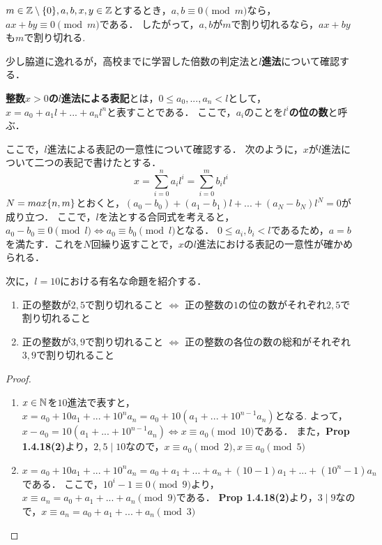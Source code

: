     \begin{cor}
      $ m \in \mathbb{Z} \setminus \lbrace0\rbrace, a,b,x,y \in \mathbb{Z}$とするとき，$a,b \equiv 0 \pmod m$なら，
      $ax + by \equiv 0 \pmod m$である．
      したがって，$a,b$が$m$で割り切れるなら，$ax+by$も$m$で割り切れる.
    \end{cor}

    少し脇道に逸れるが，高校までに学習した倍数の判定法と\textbf{$l$進法}について確認する．

    \begin{dfn}
      \textbf{整数$x>0$の$l$進法による表記}とは，$0 \leq a_0, ... , a_n < l$として，
      $x = a_0 + a_1 l + ... + a_n l^n$と表すことである．
      ここで，$a_i$のことを\textbf{$l^i$の位の数}と呼ぶ．
    \end{dfn}

    ここで，$l$進法による表記の一意性について確認する．
    次のように，$x$が$l$進法について二つの表記で書けたとする．
    \begin{displaymath}
      x = \sum_{i=0}^{n}a_i l^i = \sum_{i=0}^{m}b_i l^i
    \end{displaymath}
    $N = max \lbrace n, m\rbrace$とおくと，$(a_0 - b_0) + (a_1 - b_1) l + ... + (a_N - b_N) l^N = 0$が成り立つ．
    ここで，$l$を法とする合同式を考えると，$a_0 - b_0 \equiv 0 \pmod l \iff a_0 \equiv b_0 \pmod l$となる．
    $0 \leq a_i, b_i < l$であるため，$a=b$を満たす．これを$N$回繰り返すことで，$x$の$l$進法における表記の一意性が確かめられる．

    次に，$l=10$における有名な命題を紹介する．

    \begin{prop}
      \begin{enumerate}
        \item 正の整数が$2,5$で割り切れること $\iff$ 正の整数の$1$の位の数がそれぞれ$2,5$で割り切れること
        \item 正の整数が$3,9$で割り切れること $\iff$ 正の整数の各位の数の総和がそれぞれ$3,9$で割り切れること
      \end{enumerate}
    \end{prop}

    \begin{proof}
      \begin{enumerate}
        \item $x \in \mathbb{N}$を$10$進法で表すと，$x=a_0 + 10a_1 + ... + 10^n a_n = a_0 + 10(a_1 + ... + 10^{n-1}a_n)$となる.
        よって，$x-a_0 = 10(a_1 + ... + 10^{n-1}a_n) \iff x \equiv a_0 \pmod {10}$である．
        また，\textbf{Prop 1.4.18(2)}より，$2,5 \mid 10$なので，$x \equiv a_0 \pmod 2, x \equiv a_0 \pmod 5$
        \item $x = a_0 + 10a_1 + ... + 10^n a_n = a_0 + a_1 + ... + a_n + (10 - 1)a_1 + ... + (10^n - 1) a_n$である．
        ここで，$10^i - 1 \equiv 0 \pmod 9$より，$x \equiv a_n = a_0 + a_1 + ... + a_n \pmod 9$である．
        \textbf{Prop 1.4.18(2)}より，$3 \mid 9$なので，$x \equiv a_n = a_0 + a_1 + ... + a_n \pmod 3$
      \end{enumerate}
    \end{proof}

